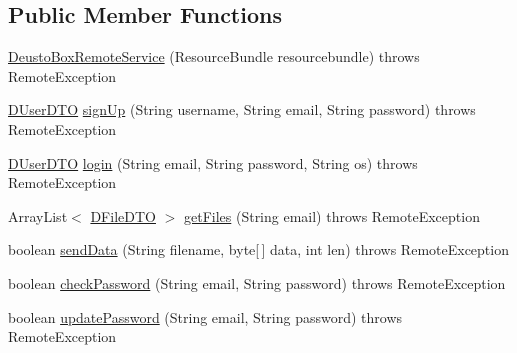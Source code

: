 \subsection*{Public Member Functions}
\begin{DoxyCompactItemize}
\item 
\mbox{\hyperlink{classes_1_1deusto_1_1bspq18_1_1e6_1_1_deusto_box_1_1_server_1_1remote_1_1_deusto_box_remote_service_a84ef229a1ca942909895d1de2dbe0453}{Deusto\+Box\+Remote\+Service}} (Resource\+Bundle resourcebundle)  throws Remote\+Exception 
\item 
\mbox{\hyperlink{classes_1_1deusto_1_1bspq18_1_1e6_1_1_deusto_box_1_1_server_1_1dto_1_1_d_user_d_t_o}{D\+User\+D\+TO}} \mbox{\hyperlink{classes_1_1deusto_1_1bspq18_1_1e6_1_1_deusto_box_1_1_server_1_1remote_1_1_deusto_box_remote_service_a68b337e7b4cb85957579b60863d7e0a0}{sign\+Up}} (String username, String email, String password)  throws Remote\+Exception 
\item 
\mbox{\hyperlink{classes_1_1deusto_1_1bspq18_1_1e6_1_1_deusto_box_1_1_server_1_1dto_1_1_d_user_d_t_o}{D\+User\+D\+TO}} \mbox{\hyperlink{classes_1_1deusto_1_1bspq18_1_1e6_1_1_deusto_box_1_1_server_1_1remote_1_1_deusto_box_remote_service_a231055c7ef7c8054f139b161fbe58626}{login}} (String email, String password, String os)  throws Remote\+Exception 
\item 
Array\+List$<$ \mbox{\hyperlink{classes_1_1deusto_1_1bspq18_1_1e6_1_1_deusto_box_1_1_server_1_1dto_1_1_d_file_d_t_o}{D\+File\+D\+TO}} $>$ \mbox{\hyperlink{classes_1_1deusto_1_1bspq18_1_1e6_1_1_deusto_box_1_1_server_1_1remote_1_1_deusto_box_remote_service_a08c60cb9bff7018bf484c7f721f71d0c}{get\+Files}} (String email)  throws Remote\+Exception 
\item 
boolean \mbox{\hyperlink{classes_1_1deusto_1_1bspq18_1_1e6_1_1_deusto_box_1_1_server_1_1remote_1_1_deusto_box_remote_service_aeeafed7d44048979f7d349f38300fc82}{send\+Data}} (String filename, byte\mbox{[}$\,$\mbox{]} data, int len)  throws Remote\+Exception 
\item 
boolean \mbox{\hyperlink{classes_1_1deusto_1_1bspq18_1_1e6_1_1_deusto_box_1_1_server_1_1remote_1_1_deusto_box_remote_service_a5554ad18e8eeaaba4cd51e598c5b6114}{check\+Password}} (String email, String password)  throws Remote\+Exception 
\item 
boolean \mbox{\hyperlink{classes_1_1deusto_1_1bspq18_1_1e6_1_1_deusto_box_1_1_server_1_1remote_1_1_deusto_box_remote_service_ae0e6d493d943f30b092a6041d0d3328e}{update\+Password}} (String email, String password)  throws Remote\+Exception 

\end{DoxyCompactItemize}

